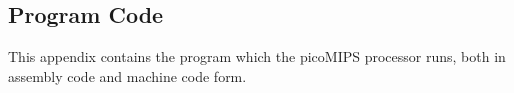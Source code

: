 \clearpage
\begin{appendices}
	
\section{Program Code} \label{app:prog-code}

This appendix contains the program which the picoMIPS processor runs, both in assembly code and machine code form.
	

\newpage



\end{appendices}